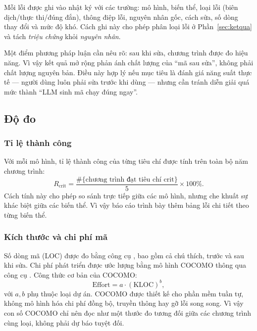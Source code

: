 Mỗi lỗi được ghi vào nhật ký với các trường: mô hình, biến thể, loại lỗi (biên
dịch/thực thi/đúng đắn), thông điệp lỗi, nguyên nhân gốc, cách sửa, số dòng thay
đổi và mức độ khó. Cách ghi này cho phép phân loại lỗi ở Phần~\ref{sec:ketqua}
và tách \emph{triệu chứng} khỏi \emph{nguyên nhân}.

Một điểm phương pháp luận cần nêu rõ: sau khi sửa, chương trình được đo hiệu
năng. Vì vậy kết quả mở rộng phản ánh chất lượng của “mã sau sửa”, không phải
chất lượng nguyên bản. Điều này hợp lý nếu mục tiêu là đánh giá năng suất thực
tế — người dùng luôn phải sửa trước khi dùng — nhưng cần tránh diễn giải quá mức
thành “LLM sinh mã chạy đúng ngay”.

\subsection{Độ đo}

\subsubsection{Tỉ lệ thành công}

Với mỗi mô hình, tỉ lệ thành công của từng tiêu chí được tính trên toàn bộ năm
chương trình:
\begin{equation}
  R_{\text{crit}} = \frac{\#\{\text{chương trình đạt tiêu chí crit}\}}{5}\times100\%.
\end{equation}
Cách tính này cho phép so sánh trực tiếp giữa các mô hình, nhưng che khuất sự
khác biệt giữa các biến thể. Vì vậy báo cáo trình bày thêm bảng lỗi chi tiết
theo từng biến thể.

\subsubsection{Kích thước và chi phí mã}

Số dòng mã (LOC) được đo bằng công cụ , bao gồm cả chú thích, trước
và sau khi sửa. Chi phí phát triển được ước lượng bằng mô hình COCOMO thông qua
công cụ . Công thức cơ bản của COCOMO:
\begin{equation}
  \text{Effort} = a \cdot (\text{KLOC})^{b},
\end{equation}
với $a,b$ phụ thuộc loại dự án. COCOMO được thiết kế cho phần mềm tuần tự, không
mô hình hóa chi phí đồng bộ, truyền thông hay gỡ lỗi song song. Vì vậy con số
COCOMO chỉ nên đọc như một thước đo tương đối giữa các chương trình cùng loại,
không phải dự báo tuyệt đối.

